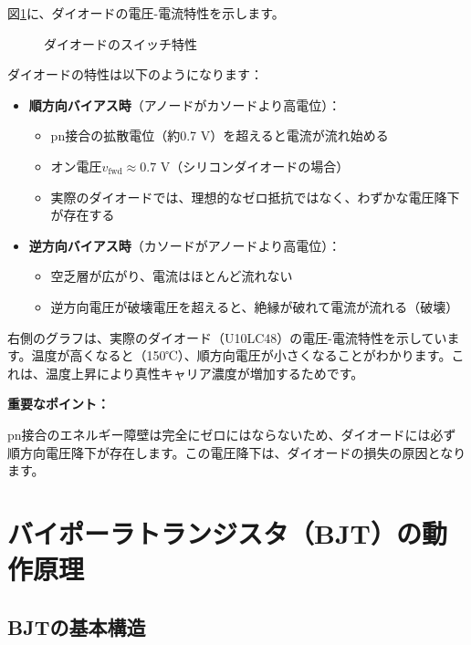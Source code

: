 図\ref{fig:diode_characteristics}に、ダイオードの電圧-電流特性を示します。

\begin{figure}[H]
\centering
{}
\caption{ダイオードのスイッチ特性}
\label{fig:diode_characteristics}
\end{figure}

ダイオードの特性は以下のようになります：

\begin{itemize}
\item \textbf{順方向バイアス時}（アノードがカソードより高電位）：
\begin{itemize}
\item pn接合の拡散電位（約0.7 V）を超えると電流が流れ始める
\item オン電圧$v_{\text{fwd}} \approx 0.7$ V（シリコンダイオードの場合）
\item 実際のダイオードでは、理想的なゼロ抵抗ではなく、わずかな電圧降下が存在する
\end{itemize}

\item \textbf{逆方向バイアス時}（カソードがアノードより高電位）：
\begin{itemize}
\item 空乏層が広がり、電流はほとんど流れない
\item 逆方向電圧が破壊電圧を超えると、絶縁が破れて電流が流れる（破壊）
\end{itemize}
\end{itemize}

右側のグラフは、実際のダイオード（U10LC48）の電圧-電流特性を示しています。温度が高くなると（150℃）、順方向電圧が小さくなることがわかります。これは、温度上昇により真性キャリア濃度が増加するためです。

\textbf{重要なポイント：}

pn接合のエネルギー障壁は完全にゼロにはならないため、ダイオードには必ず順方向電圧降下が存在します。この電圧降下は、ダイオードの損失の原因となります。

\section{バイポーラトランジスタ（BJT）の動作原理}

\subsection{BJTの基本構造}

